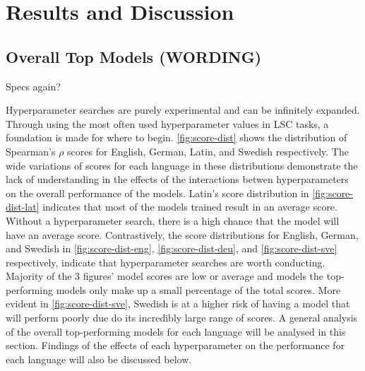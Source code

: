 \section{Results and Discussion}
\label{sec:results}

\subsection{Overall Top Models (WORDING)}
Specs again?

Hyperparameter searches are purely experimental and can be infinitely expanded. Through using the most often used hyperparameter values in LSC tasks, a foundation is made for where to begin. \autoref{fig:score-dist} shows the distribution of Spearman's $\rho$ scores for English, German, Latin, and Swedish respectively. The wide variations of scores for each language in these distributions demonstrate the lack of understanding in the effects of the interactions betwen hyperparameters on the overall performance of the models. Latin's score distribution in \autoref{fig:score-dist-lat} indicates that most of the models trained result in an average score. Without a hyperparameter search, there is a high chance that the model will have an average score. Contrastively, the score distributions for English, German, and Swedish in  \autoref{fig:score-dist-eng}, \autoref{fig:score-dist-deu}, and \autoref{fig:score-dist-sve} respectively, indicate that hyperparameter searches are worth conducting. Majority of the 3 figures' model scores are low or average and models the top-performing models only make up a small percentage of the total scores. More evident in \autoref{fig:score-dist-sve}, Swedish is at a higher risk of having a model that will perform poorly due do its incredibly large range of scores. A general analysis of the overall top-performing models for each language will be analysed in this section. Findings of the effects of each hyperparameter on the performance for each language will also be discussed below. 

